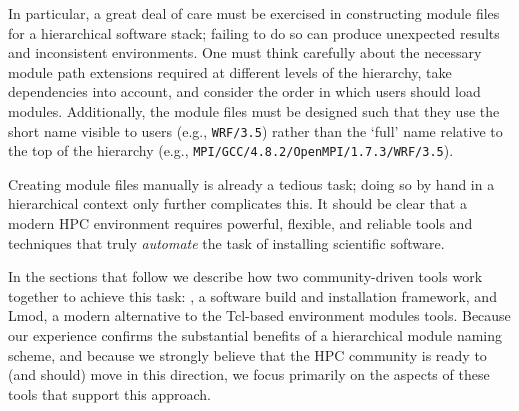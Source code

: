 In particular, a great deal of care must be exercised in constructing module files
for a hierarchical software stack; failing to do so can produce unexpected results
and inconsistent environments. One must think carefully about the necessary module
path extensions required at different levels of the hierarchy, take dependencies
into account, and consider the order in which users should load modules. Additionally, the
module files must be designed such that they use the short name visible to users
(e.g., \texttt{\small WRF/3.5}) rather than the `full' name relative to the top of
the hierarchy (e.g., \texttt{\small MPI/GCC/4.8.2/OpenMPI/1.7.3/WRF/3.5}).

Creating module files manually is already a tedious task; doing so by hand in a
hierarchical context only further complicates this. It should be clear that a modern 
HPC environment requires powerful, flexible, and reliable tools and techniques that
truly \emph{automate} the task of installing scientific software.

In the sections that follow we describe how two community-driven tools work
together to achieve this task: \easybuild{}, a software build and installation
framework, and Lmod, a modern alternative to the Tcl-based environment modules
tools. Because our experience confirms the substantial benefits of a hierarchical
module naming scheme, and because we strongly believe that the HPC community is
ready to (and should) move in this direction, we focus primarily on the aspects
of these tools that support this approach.
